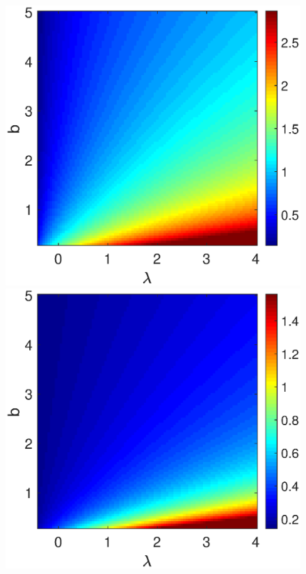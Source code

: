 \begin{figure}[h]
\centering
\begin{minipage}{0.45\linewidth}
  \begin{center}
\includegraphics[width=1\linewidth]{Images/photo14_1.eps}
\end{center}
  \end{minipage} 
  \begin{minipage}{0.45\linewidth}
  \begin{center}
\includegraphics[width=1\linewidth]{Images/photo14_2.eps}
\end{center}


\end{minipage}
\end{figure}
